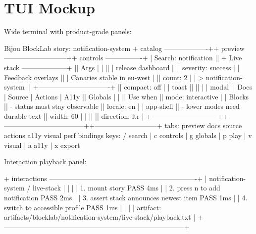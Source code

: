 

\section{TUI Mockup}\label{record-135-tui-mockup}

Wide terminal with product-grade panels:

\begin{CodeBlock}
Bijou BlockLab                                      story: notification-system
+ catalog -------------------++ preview ---------------------------++ controls ----------------+
| Search: notification        || + Live stack --------------------+ || Args                     |
|                             || | release dashboard              | || severity: success        |
| Feedback overlays           || | Canaries stable in eu-west     | || count: 2                 |
| > notification-system       || +-------------------------------+ || compact: off             |
|   toast                     ||                                   ||                           |
|   modal                     || Docs | Source | Actions | A11y      || Globals                  |
|                             || Use when                          || mode: interactive        |
| Blocks                      || - status must stay observable     || locale: en               |
|   app-shell                 || - lower modes need durable text    || width: 60                |
|                             ||                                   || direction: ltr           |
+-----------------------------++-----------------------------------++---------------------------+
tabs: preview docs source actions a11y visual perf bindings
keys: / search | c controls | g globals | p play | v visual | a a11y | x export
\end{CodeBlock}

Interaction playback panel:

\begin{CodeBlock}
+ interactions ----------------------------------------------------------------+
| notification-system / live-stack                                             |
|                                                                              |
| 1. mount story                                           PASS  4ms            |
| 2. press n to add notification                          PASS  2ms            |
| 3. assert stack announces newest item                    PASS  1ms            |
| 4. switch to accessible profile                          PASS  1ms            |
|                                                                              |
| artifact: artifacts/blocklab/notification-system/live-stack/playback.txt      |
+------------------------------------------------------------------------------+
\end{CodeBlock}

